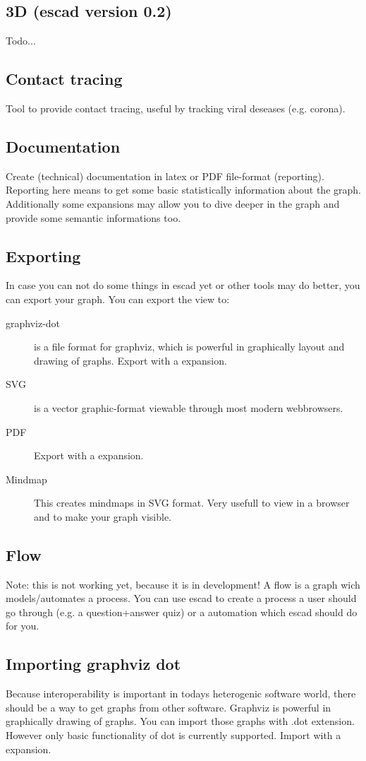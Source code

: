 \documentclass[a4paper, 12pt, openany]{scrbook}
\begin{document}
\subsection{3D (escad version 0.2)}
Todo...
\subsection{Contact tracing}
Tool to provide contact tracing, useful by tracking viral deseases (e.g. corona).
\subsection{Documentation}
Create (technical) documentation in latex or PDF file-format (reporting). Reporting here means to get some basic statistically information about the graph. Additionally some expansions may allow you to dive deeper in the graph and provide some semantic informations too.
\subsection{Exporting}
In case you can not do some things in escad yet or other tools may do better, you can export your graph. You can export the view to:
\begin{description}
\item[graphviz-dot] is a file format for graphviz, which is powerful in graphically layout and drawing of graphs. Export with a expansion.
\item[SVG] is a vector graphic-format viewable through most modern webbrowsers.
\item[PDF] Export with a expansion.
\item[Mindmap] This creates mindmaps in SVG format. Very usefull to view in a browser and to make your graph visible.
\end{description}
\subsection{Flow}
Note: this is not working yet, because it is in development!
A flow is a graph wich models/automates a process. You can use escad to create a process a user should go through (e.g. a question+answer quiz) or a automation which escad should do for you.
\subsection{Importing graphviz dot}
Because interoperability is important in todays heterogenic software world, there should be a way to get graphs from other software.
Graphviz is powerful in graphically drawing of graphs. You can import those graphs with .dot extension. However only basic functionality of dot is currently supported. Import with a expansion.
\end{document}
